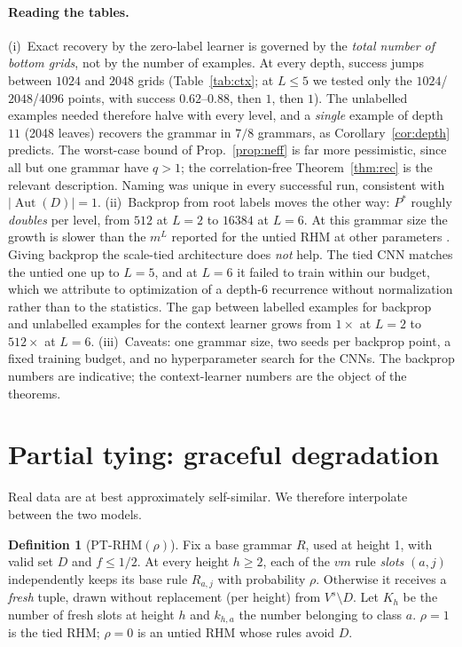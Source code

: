 \documentclass[11pt]{article}
\theoremstyle{definition}
\newtheorem{definition}[theorem]{Definition}
\newcommand{\Aut}{\operatorname{Aut}}
\begin{document}
\paragraph{Reading the tables.}
(i)~Exact recovery by the zero-label learner is governed by the \emph{total number of bottom
grids}, not by the number of examples. At every depth, success jumps between $1024$ and $2048$
grids (Table~\ref{tab:ctx}; at $L\le5$ we tested only the $1024$/$2048$/$4096$ points, with
success $0.62$--$0.88$, then $1$, then $1$). The unlabelled examples needed therefore halve with
every level, and a \emph{single} example of depth $11$ (2048 leaves) recovers the grammar in
$7/8$ grammars, as Corollary~\ref{cor:depth} predicts. The worst-case bound of
Prop.~\ref{prop:neff} is far more pessimistic, since all but one grammar have $q>1$; the
correlation-free Theorem~\ref{thm:rec} is the relevant description. Naming was unique in every
successful run, consistent with $|\Aut(D)|=1$.
(ii)~Backprop from root labels moves the other way: $P^*$ roughly \emph{doubles} per level, from
$512$ at $L=2$ to $16384$ at $L=6$. At this grammar size the growth is slower than the $m^L$
reported for the untied RHM at other parameters \cite{cagnetta2024}. Giving backprop the
scale-tied architecture does \emph{not} help. The tied CNN matches the untied one up to $L=5$,
and at $L=6$ it failed to train within our budget, which we attribute to optimization of a
depth-6 recurrence without normalization rather than to the statistics. The gap between labelled
examples for backprop and unlabelled examples for the context learner grows from $1\times$ at
$L=2$ to $512\times$ at $L=6$.
(iii)~Caveats: one grammar size, two seeds per backprop point, a fixed training budget, and no
hyperparameter search for the CNNs. The backprop numbers are indicative; the context-learner
numbers are the object of the theorems.

\section{Partial tying: graceful degradation}\label{sec:partial}
Real data are at best approximately self-similar. We therefore interpolate between the two
models.

\begin{definition}[PT-RHM$(\rho)$]
Fix a base grammar $R$, used at height 1, with valid set $D$ and $f\le1/2$. At every height
$h\ge2$, each of the $vm$ rule \emph{slots} $(a,j)$ independently keeps its base rule
$R_{a,j}$ with probability $\rho$. Otherwise it receives a \emph{fresh} tuple, drawn without
replacement (per height) from $V^s\setminus D$. Let $K_h$ be the number of fresh slots at
height $h$ and $k_{h,a}$ the number belonging to class $a$. $\rho=1$ is the tied RHM; $\rho=0$
is an untied RHM whose rules avoid $D$.
\end{definition}
\end{document}
